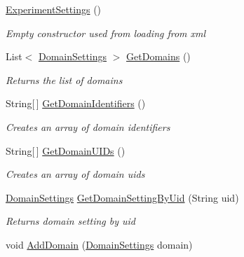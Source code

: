 \begin{DoxyCompactItemize}
\item 
\hyperlink{class_web_analyzer_1_1_models_1_1_settings_model_1_1_experiment_settings_a98955573a3878cfba75a880da391ac97}{Experiment\+Settings} ()
\begin{DoxyCompactList}\small\item\em Empty constructor used from loading from xml \end{DoxyCompactList}\item 
List$<$ \hyperlink{class_web_analyzer_1_1_models_1_1_settings_model_1_1_domain_settings}{Domain\+Settings} $>$ \hyperlink{class_web_analyzer_1_1_models_1_1_settings_model_1_1_experiment_settings_a742964a9fce4abd6504b4894f25a845b}{Get\+Domains} ()
\begin{DoxyCompactList}\small\item\em Returns the list of domains \end{DoxyCompactList}\item 
String\mbox{[}$\,$\mbox{]} \hyperlink{class_web_analyzer_1_1_models_1_1_settings_model_1_1_experiment_settings_a10c72f98c76544417bd84988a55dc2c2}{Get\+Domain\+Identifiers} ()
\begin{DoxyCompactList}\small\item\em Creates an array of domain identifiers \end{DoxyCompactList}\item 
String\mbox{[}$\,$\mbox{]} \hyperlink{class_web_analyzer_1_1_models_1_1_settings_model_1_1_experiment_settings_a21c34742e9bcd0fedd0cec8bfb40bf00}{Get\+Domain\+U\+I\+Ds} ()
\begin{DoxyCompactList}\small\item\em Creates an array of domain uids \end{DoxyCompactList}\item 
\hyperlink{class_web_analyzer_1_1_models_1_1_settings_model_1_1_domain_settings}{Domain\+Settings} \hyperlink{class_web_analyzer_1_1_models_1_1_settings_model_1_1_experiment_settings_aca31542aa283999bfb472444b7e4a565}{Get\+Domain\+Setting\+By\+Uid} (String uid)
\begin{DoxyCompactList}\small\item\em Returns domain setting by uid \end{DoxyCompactList}\item 
void \hyperlink{class_web_analyzer_1_1_models_1_1_settings_model_1_1_experiment_settings_ae886e26f8cb954a739fa2e1fc5b224a4}{Add\+Domain} (\hyperlink{class_web_analyzer_1_1_models_1_1_settings_model_1_1_domain_settings}{Domain\+Settings} domain)

\end{DoxyCompactItemize}
